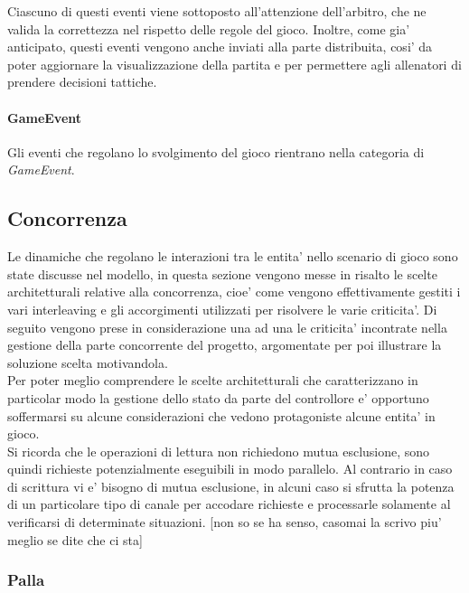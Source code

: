 Ciascuno di questi eventi viene sottoposto all'attenzione dell'arbitro, che ne valida la correttezza nel rispetto delle regole del gioco. Inoltre, come gia' anticipato, questi eventi vengono anche inviati alla parte distribuita, cosi' da poter aggiornare la visualizzazione della partita e per permettere agli allenatori di prendere decisioni tattiche.

\paragraph{GameEvent} Gli eventi che regolano lo svolgimento del gioco rientrano nella categoria di \textit{GameEvent}.

\subsection*{Concorrenza}
%
\label{sec:analisi_concorrenza}

Le dinamiche che regolano le interazioni tra le entita’ nello scenario di gioco sono state discusse nel modello, in questa sezione vengono messe in risalto le scelte architetturali relative alla concorrenza, cioe’ come vengono effettivamente gestiti i vari interleaving e gli accorgimenti utilizzati per risolvere le varie criticita’. Di seguito vengono prese in considerazione una ad una le criticita' incontrate nella gestione della parte concorrente del progetto, argomentate per poi illustrare la soluzione scelta motivandola.\\

Per poter meglio comprendere le scelte architetturali che caratterizzano in particolar modo la gestione dello stato da parte del controllore e’ opportuno soffermarsi su alcune considerazioni che vedono protagoniste alcune entita’ in gioco.\\

Si ricorda che le operazioni di lettura non richiedono mutua esclusione, sono quindi richieste potenzialmente eseguibili in modo parallelo. Al contrario in caso di scrittura vi e’ bisogno di mutua esclusione, in alcuni caso si sfrutta la potenza di un particolare tipo di canale per accodare richieste e processarle solamente al verificarsi di determinate situazioni. [non so se ha senso, casomai la scrivo piu’ meglio se dite che ci sta]

\subsubsection*{Palla}
%
\label{sec:analisi_concorrenza_palla}

